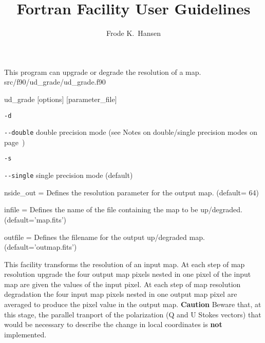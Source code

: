 
\sloppy


\title{\healpix Fortran Facility User Guidelines}
 \section[ud\_grade]{\nosectionname}
\label{fac:ud_grade}
\author{Frode K.~Hansen}

\begin{facility}
{This program can upgrade or degrade the resolution of a \healpix map.} 
{src/f90/ud\_grade/ud\_grade.f90}
\end{facility}

\begin{f90facility}
{ud\_grade [options] [parameter\_file]}
\end{f90facility}

\begin{options}
  \begin{optionlistwide}{} %
    \item[{\tt -d}]
    \item[{\tt -}{\tt -}{\tt double}] double precision mode (see Notes on double/single precision modes on page~\pageref{page:ioprec})
    \item[{\tt -s}]
    \item[{\tt -}{\tt -}{\tt single}] single precision mode (default)
  \end{optionlistwide}
\end{options}

\begin{qualifiers}
  \begin{qulist}{} %
    \item[{nside\_out = }] Defines the resolution parameter for the output map. 
	(default= 64)
\item[{infile = }] Defines the name of the file containing the map to be 
up/degraded.
(default='map.fits')
\item[{outfile = }] Defines the filename for the output up/degraded map.
(default='outmap.fits')
  \end{qulist}
\end{qualifiers}

\begin{codedescription}
{
This facility transforms the resolution of an input \healpix map.
At each step of map resolution upgrade the four output map pixels nested 
in  one pixel of 
the input map are given  the values of the input pixel. 
At each step of map resolution degradation
the four input map pixels nested in one output map pixel
are averaged to produce the pixel
value in the output map.
{\bf Caution} Beware that, at this stage, the parallel tranport of the polarization
(Q and U Stokes vectors) that would be necessary to describe the change
in local coordinates is {\bf not} implemented.
}
\end{codedescription}

